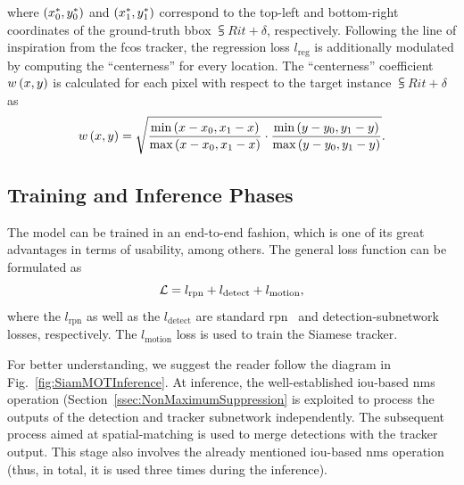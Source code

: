 where $\left( {{x}_{0}^{*}, {y}_{0}^{*}} \right)$ and $\left( {{x}_{1}^{*}, {y}_{1}^{*}} \right)$ correspond to the top-left and bottom-right coordinates of the ground-truth \gls{bbox} $\subsup{R}{i}{t + \delta}$, respectively. Following the line of inspiration from the \gls{fcos} tracker, the regression loss $l_{\text{reg}}$ is additionally modulated by computing the ``centerness'' for every location. The ``centerness'' coefficient ${w} \left( x, y \right)$ is calculated for each pixel with respect to the target instance $\subsup{R}{i}{t + \delta}$ as
\begin{equation}
    {w} \left( x, y \right) =
    \sqrt{
        \frac{\text{min} \left( x - x_0, x_1 - x \right)}{\text{max} \left( x - x_0, x_1 - x \right)}
        \cdot
        \frac{\text{min} \left( y - y_0, y_1 - y \right)}{\text{max} \left( y - y_0, y_1 - y \right)}
    }.
\end{equation}

\subsection{Training and Inference Phases}

The \siammot{} model can be trained in an end-to-end fashion, which is one of its great advantages in terms of usability, among others. The general loss function can be formulated as
\begin{equation}
    \label{eq:SiamMOTGeneralLoss}
    \mathcal{L} = l_{\text{rpn}} + l_{\text{detect}} + l_{\text{motion}},
\end{equation}
where the $l_{\text{rpn}}$ as well as the $l_{\text{detect}}$ are standard \gls{rpn}~\cite{ren2017fasterrcnn} and detection-subnetwork~\cite{girshick2015fast} losses, respectively. The $l_{\text{motion}}$ loss is used to train the Siamese tracker.

For better understanding, we suggest the reader follow the diagram in Fig.~\ref{fig:SiamMOTInference}. At inference, the well-established \gls{iou}-based \gls{nms} operation (Section~\ref{ssec:NonMaximumSuppression} is exploited to process the outputs of the detection and tracker subnetwork independently. The subsequent process aimed at spatial-matching is used to merge detections with the tracker output. This stage also involves the already mentioned \gls{iou}-based \gls{nms} operation (thus, in total, it is used three times during the inference).


